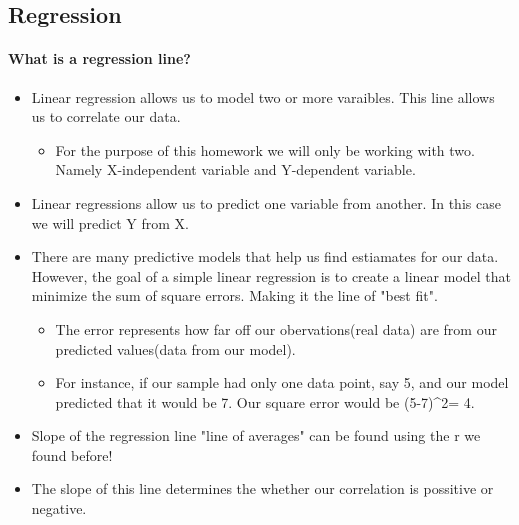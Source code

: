 \documentclass[11pt]{article}
\providecommand{\tightlist}{%
      \setlength{\itemsep}{0pt}\setlength{\parskip}{0pt}}
\begin{document}
    \subsection{Regression }\label{regression}

    \paragraph{What is a regression line?}\label{what-is-a-regression-line}

\begin{itemize}
\tightlist
\item
  Linear regression allows us to model two or more varaibles. This line
  allows us to correlate our data.

  \begin{itemize}
  \tightlist
  \item
    For the purpose of this homework we will only be working with two.
    Namely X-independent variable and Y-dependent variable.
  \end{itemize}
\item
  Linear regressions allow us to predict one variable from another. In
  this case we will predict Y from X.
\item
  There are many predictive models that help us find estiamates for our
  data. However, the goal of a simple linear regression is to create a
  linear model that minimize the sum of square errors. Making it the
  line of "best fit".

  \begin{itemize}
  \tightlist
  \item
    The error represents how far off our obervations(real data) are from
    our predicted values(data from our model).
  \item
    For instance, if our sample had only one data point, say 5, and our
    model predicted that it would be 7. Our square error would be
    (5-7)\^{}2= 4.
  \end{itemize}
\end{itemize}

    

    \begin{itemize}
\tightlist
\item
  Slope of the regression line "line of averages" can be found using the
  r we found before!
\item
  The slope of this line determines the whether our correlation is
  possitive or negative.
\end{itemize}
\end{document}
